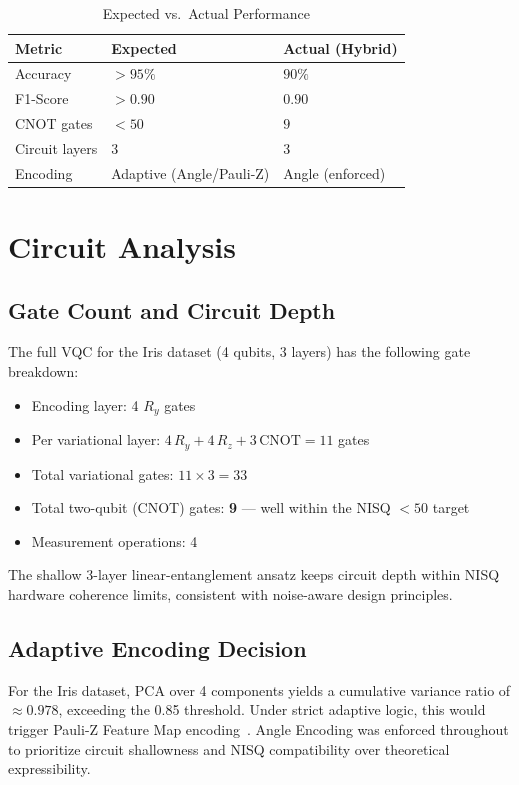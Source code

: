 \documentclass[conference]{IEEEtran}
\begin{document}
\begin{table}[h]
\caption{Expected vs.\ Actual Performance}
\label{tab:expected}
\centering
\begin{tabular}{lll}
\toprule
\textbf{Metric} & \textbf{Expected} & \textbf{Actual (Hybrid)} \\
\midrule
Accuracy        & $>95\%$                  & $90\%$ \\
F1-Score        & $>0.90$                  & $0.90$ \\
CNOT gates      & $<50$                    & $9$ \\
Circuit layers  & 3                        & 3 \\
Encoding        & Adaptive (Angle/Pauli-Z) & Angle (enforced) \\
\bottomrule
\end{tabular}
\end{table}

\section{Circuit Analysis}

\subsection{Gate Count and Circuit Depth}

The full VQC for the Iris dataset (4 qubits, 3 layers) has the following gate breakdown:
\begin{itemize}
  \item Encoding layer: 4 $R_y$ gates
  \item Per variational layer: $4\,R_y + 4\,R_z + 3\,\text{CNOT} = 11$ gates
  \item Total variational gates: $11 \times 3 = 33$
  \item Total two-qubit (CNOT) gates: \textbf{9} — well within the NISQ $<50$ target
  \item Measurement operations: 4
\end{itemize}

The shallow 3-layer linear-entanglement ansatz keeps circuit depth within NISQ hardware coherence limits, consistent with noise-aware design principles.

\subsection{Adaptive Encoding Decision}

For the Iris dataset, PCA over 4 components yields a cumulative variance ratio of $\approx 0.978$, exceeding the 0.85 threshold. Under strict adaptive logic, this would trigger Pauli-Z Feature Map encoding~\cite{havlicek2019}. Angle Encoding was enforced throughout to prioritize circuit shallowness and NISQ compatibility over theoretical expressibility.
\end{document}
